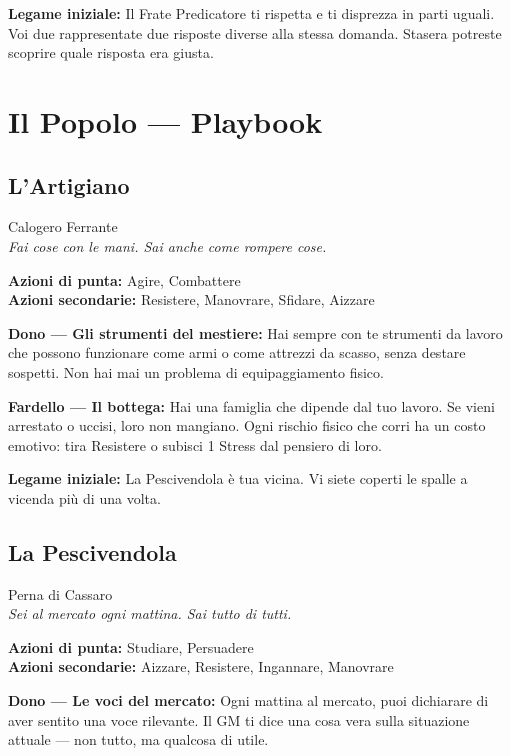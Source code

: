 \textbf{Legame iniziale:} Il Frate Predicatore ti rispetta e ti
disprezza in parti uguali. Voi due rappresentate due risposte
diverse alla stessa domanda. Stasera potreste scoprire quale
risposta era giusta.

\secsep

\section{Il Popolo — Playbook}

\subsection{L'Artigiano}
{\cinzel\footnotesize\color{grigionote} Calogero Ferrante}\\
\textit{Fai cose con le mani. Sai anche come rompere cose.}

\textbf{Azioni di punta:} Agire, Combattere\\
\textbf{Azioni secondarie:} Resistere, Manovrare, Sfidare, Aizzare

\textbf{Dono — Gli strumenti del mestiere:} Hai sempre con te
strumenti da lavoro che possono funzionare come armi o come
attrezzi da scasso, senza destare sospetti. Non hai mai un
problema di equipaggiamento fisico.

\textbf{Fardello — Il bottega:} Hai una famiglia che dipende dal
tuo lavoro. Se vieni arrestato o uccisi, loro non mangiano.
Ogni rischio fisico che corri ha un costo emotivo: tira Resistere
o subisci 1 Stress dal pensiero di loro.

\textbf{Legame iniziale:} La Pescivendola è tua vicina. Vi siete
coperti le spalle a vicenda più di una volta.

\filetto

\subsection{La Pescivendola}
{\cinzel\footnotesize\color{grigionote} Perna di Cassaro}\\
\textit{Sei al mercato ogni mattina. Sai tutto di tutti.}

\textbf{Azioni di punta:} Studiare, Persuadere\\
\textbf{Azioni secondarie:} Aizzare, Resistere, Ingannare, Manovrare

\textbf{Dono — Le voci del mercato:} Ogni mattina al mercato,
puoi dichiarare di aver sentito una voce rilevante. Il GM ti
dice una cosa vera sulla situazione attuale — non tutto, ma
qualcosa di utile.

